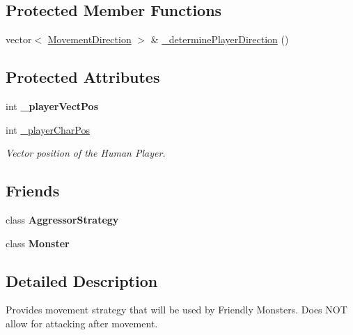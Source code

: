 \subsection*{Protected Member Functions}
\begin{DoxyCompactItemize}
\item 
vector$<$ \hyperlink{_movement_strategy_8h_a0b5e764f0ec9a407e9b8789f0259d754}{Movement\+Direction} $>$ \& \hyperlink{class_friendly_strategy_a83e515ba2c3a8d9895f2bdde08091b1d}{\+\_\+determine\+Player\+Direction} ()
\end{DoxyCompactItemize}
\subsection*{Protected Attributes}
\begin{DoxyCompactItemize}
\item 
\hypertarget{class_friendly_strategy_a88c6a8387aae5dd266d167e43d4088f7}{}\label{class_friendly_strategy_a88c6a8387aae5dd266d167e43d4088f7} 
int {\bfseries \+\_\+player\+Vect\+Pos}
\item 
\hypertarget{class_friendly_strategy_a3c35c8ee0aee35980193013f20dff11f}{}\label{class_friendly_strategy_a3c35c8ee0aee35980193013f20dff11f} 
int \hyperlink{class_friendly_strategy_a3c35c8ee0aee35980193013f20dff11f}{\+\_\+player\+Char\+Pos}
\begin{DoxyCompactList}\small\item\em Vector position of the Human Player. \end{DoxyCompactList}\end{DoxyCompactItemize}
\subsection*{Friends}
\begin{DoxyCompactItemize}
\item 
\hypertarget{class_friendly_strategy_ae7b46fff3330dfbc891c8d661d6e8f07}{}\label{class_friendly_strategy_ae7b46fff3330dfbc891c8d661d6e8f07} 
class {\bfseries Aggressor\+Strategy}
\item 
\hypertarget{class_friendly_strategy_acd1214449703bd4d1b095efc07489f45}{}\label{class_friendly_strategy_acd1214449703bd4d1b095efc07489f45} 
class {\bfseries Monster}
\end{DoxyCompactItemize}


\subsection{Detailed Description}
Provides movement strategy that will be used by Friendly Monsters. Does N\+OT allow for attacking after movement. 

